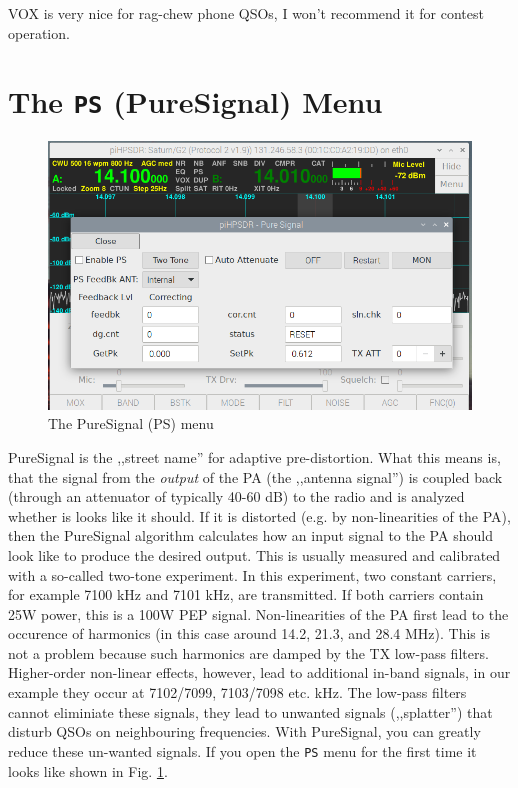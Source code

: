 \documentclass[12pt]{book}
\def\bltt#1{\texttt{\color{blue}#1}}
\begin{document}
VOX is very nice for rag-chew phone QSOs, I won't recommend it for contest operation.

\section{The \texttt{PS} (PureSignal) Menu}

\begin{figure}[ht]
\center
\includegraphics[width=12cm]{PSMenu.png}
\caption{The PureSignal (PS) menu}
\label{fig:PSMenu}
\end{figure}

PureSignal is the ,,street name'' for adaptive pre-distortion. What this means is, that
the signal from the \textit{output} of the PA (the ,,antenna signal'') is coupled
back (through an attenuator of typically 40-60 dB) to the radio and is analyzed
whether is looks like it should. If it is distorted (e.g. by non-linearities of the PA),
then the PureSignal algorithm calculates how an input signal to the PA should look like
to produce the desired output. This is usually measured and calibrated with a so-called
two-tone experiment. In this experiment, two constant carriers, for example 7100 kHz
and 7101 kHz, are transmitted. If both carriers contain 25W power, this is
a 100W PEP signal. Non-linearities of the PA first lead to the occurence of harmonics
(in this case around 14.2, 21.3, and 28.4 MHz). This is not a problem because
such harmonics are  damped by the TX low-pass filters. Higher-order non-linear effects,
however, lead to additional in-band signals, in our example they occur at
7102/7099, 7103/7098 etc. kHz. The low-pass filters cannot eliminiate these signals,
they lead to unwanted signals (,,splatter'') that disturb QSOs on neighbouring
frequencies. With PureSignal, you can greatly reduce these un-wanted signals.
If you open the \bltt{PS} menu for the first time it looks like shown in Fig.
\ref{fig:PSMenu}.
\end{document}
